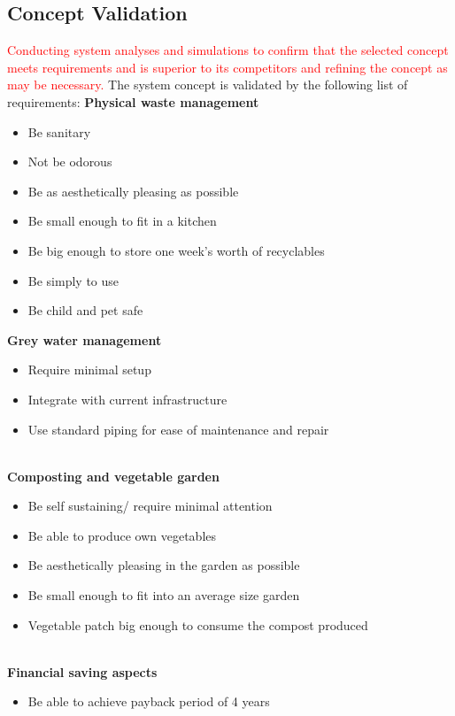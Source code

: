 \documentclass[a4paper,11pt,fleqn]{report}
\begin{document}
\subsection{Concept Validation}
\textcolor{red}{Conducting system analyses and simulations to confirm that the selected concept meets requirements and is superior to its competitors and refining the concept as may be necessary.}
The system concept is validated by the following list of requirements:
\textbf{Physical waste management}
\begin{itemize}
\item Be sanitary
\item Not be odorous
\item Be as aesthetically pleasing as possible
\item Be small enough to fit in a kitchen
\item Be big enough to store one week's worth of recyclables
\item Be simply to use
\item Be child and pet safe
\end{itemize}

\textbf{Grey water management}
\begin{itemize}
\item Require minimal setup
\item Integrate with current infrastructure
\item Use standard piping for ease of maintenance and repair
\end{itemize}\\

\textbf{Composting and vegetable garden}
\begin{itemize}
\item Be self sustaining/ require minimal attention
\item Be able to produce own vegetables
\item Be aesthetically pleasing in the garden as possible
\item Be small enough to fit into an average size garden
\item Vegetable patch big enough to consume the compost produced
\end{itemize}\\

\textbf{Financial saving aspects }
\begin{itemize}
\item Be able to achieve payback period of 4 years
\end{itemize}\\
\end{document}
